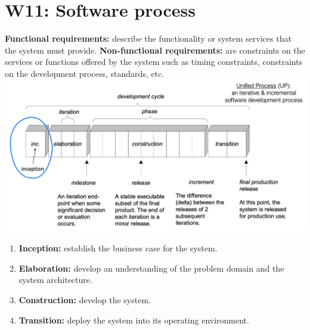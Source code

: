 \section{W11: Software process}
\textbf{Functional requirements:} describe the functionality or system services that the system must provide.
\textbf{Non-functional requirements:} are constraints on the services or functions offered by the system such as timing constraints, constraints on the development process, standards, etc.
\includegraphics[width=\linewidth]{figs/unified-process.png}
\begin{enumerate}
    \item \textbf{Inception:} establish the business case for the system.
    \item \textbf{Elaboration:} develop an understanding of the problem domain and the system architecture.
    \item \textbf{Construction:} develop the system.
    \item \textbf{Transition:} deploy the system into its operating environment.
\end{enumerate}
